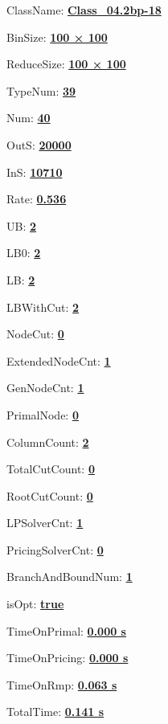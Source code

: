 \documentclass[11pt]{article}
\begin{document}
\pagestyle{empty}


ClassName: \underline{\textbf{Class_04.2bp-18}}
\par
BinSize: \underline{\textbf{100 × 100}}
\par
ReduceSize: \underline{\textbf{100 × 100}}
\par
TypeNum: \underline{\textbf{39}}
\par
Num: \underline{\textbf{40}}
\par
OutS: \underline{\textbf{20000}}
\par
InS: \underline{\textbf{10710}}
\par
Rate: \underline{\textbf{0.536}}
\par
UB: \underline{\textbf{2}}
\par
LB0: \underline{\textbf{2}}
\par
LB: \underline{\textbf{2}}
\par
LBWithCut: \underline{\textbf{2}}
\par
NodeCut: \underline{\textbf{0}}
\par
ExtendedNodeCnt: \underline{\textbf{1}}
\par
GenNodeCnt: \underline{\textbf{1}}
\par
PrimalNode: \underline{\textbf{0}}
\par
ColumnCount: \underline{\textbf{2}}
\par
TotalCutCount: \underline{\textbf{0}}
\par
RootCutCount: \underline{\textbf{0}}
\par
LPSolverCnt: \underline{\textbf{1}}
\par
PricingSolverCnt: \underline{\textbf{0}}
\par
BranchAndBoundNum: \underline{\textbf{1}}
\par
isOpt: \underline{\textbf{true}}
\par
TimeOnPrimal: \underline{\textbf{0.000 s}}
\par
TimeOnPricing: \underline{\textbf{0.000 s}}
\par
TimeOnRmp: \underline{\textbf{0.063 s}}
\par
TotalTime: \underline{\textbf{0.141 s}}
\par
\newpage
\end{document}
